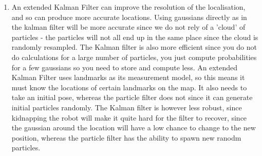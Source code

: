 \documentclass[12pt,a4paper]{article}
\begin{document}
\begin{enumerate}[label=(\alph*)]
	\item An extended Kalman Filter can improve the resolution of the localisation, and so can produce more accurate locations. Using gaussians directly as in the kalman filter will be more accurate since we do not rely of a 'cloud' of particles - the particles will not all end up in the same place since the cloud is randomly resampled. The Kalman filter is also more efficient since you do not do calculations for a large number of particles, you just compute probabilities for a few gaussians so you need to store and compute less. An extended Kalman Filter uses landmarks as its measurement model, so this means it must know the locations of certain landmarks on the map. It also needs to take an initial pose, whereas the particle filter does not since it can generate initial particles randomly. The Kalman filter is however less robust, since kidnapping the robot will make it quite hard for the filter to recover, since the gaussian around the location will have a low chance to change to the new position, whereas the particle filter has the ability to spawn new ranodm particles.
\end{enumerate}
\end{document}
